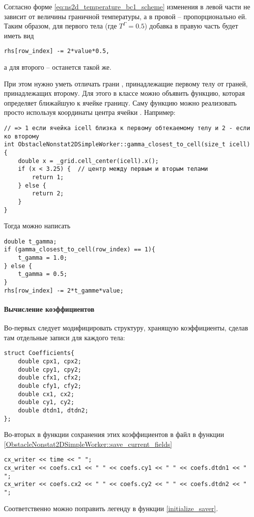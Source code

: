 Согласно форме
\cref{eq:ns2d_temperature_bc1_scheme}
изменения в левой части не зависит от величины граничной температуры,
а в провой -- пропорционально ей.
Таким образом, для первого тела (где $T^\Gamma = 0.5$) добавка в правую часть будет иметь вид
\begin{verbatim}
rhs[row_index] -= 2*value*0.5,
\end{verbatim}
а для второго -- останется такой же.

При этом нужно уметь отличать грани , принадлежащие
первому телу от граней, принадлежащих второму.
Для этого в классе  можно
объявить функцию, которая определяет ближайшую к ячейке границу.
Саму функцию можно реализовать просто используя координаты
центра ячейки . Например:
\begin{verbatim}
// => 1 если ячейка icell близка к первому обтекаемому телу и 2 - если ко второму
int ObstacleNonstat2DSimpleWorker::gamma_closest_to_cell(size_t icell){
	double x = _grid.cell_center(icell).x();
	if (x < 3.25) {  // центр между первым и вторым телами
		return 1;
	} else {
		return 2;
	}
}
\end{verbatim}
Тогда можно написать
\begin{verbatim}
double t_gamma;
if (gamma_closest_to_cell(row_index) == 1){
	t_gamma = 1.0;
} else {
	t_gamma = 0.5;
}
rhs[row_index] -= 2*t_gamme*value;
\end{verbatim}

\paragraph{Вычисление коэффициентов}
Во-первых следует модифицировать структуру, хранящую коэффициенты,
сделав там отдельные записи для каждого тела:
\begin{verbatim}
struct Coefficients{
	double cpx1, cpx2;
	double cpy1, cpy2;
	double cfx1, cfx2;
	double cfy1, cfy2;
	double cx1, cx2;
	double cy1, cy2;
	double dtdn1, dtdn2;
};
\end{verbatim}
Во-вторых в функции сохранения этих коэффициентов в файл
в функции \cref{ObstacleNonstat2DSimpleWorker::save_current_fields}
\begin{verbatim}
cx_writer << time << " ";
cx_writer << coefs.cx1 << " " << coefs.cy1 << " " << coefs.dtdn1 << " ";
cx_writer << coefs.cx2 << " " << coefs.cy2 << " " << coefs.dtdn2 << " ";
\end{verbatim}
Соответственно можно поправить легенду в функции \cref{initialize_saver}.

